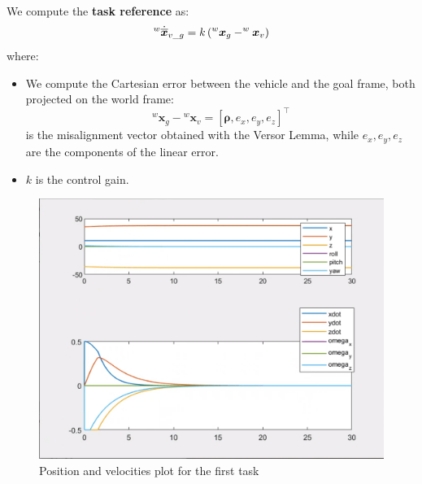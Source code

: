\documentclass{article}
\begin{document}
\noindent
\vspace{5px}
We compute the \textbf{task reference} as:
\begin{equation}
\large
    ^{w}\dot{\overline{\boldsymbol{x}}}_{v\_g}=k\left(^{w} \boldsymbol{x}_{g}-^{w} \boldsymbol{x}_{v}\right)
\end{equation}
where:
\begin{itemize}
\item We compute the Cartesian error between the vehicle and the goal frame, both projected on the world frame:
\begin{equation}
    {^w} \boldsymbol{x}_{g} - {^w}\boldsymbol{x}_{v} = [\boldsymbol{\rho}, e_{x}, e_{y}, e_{z}]^\top
\end{equation}
\boldsymbol{$\rho$} is the misalignment vector obtained with the Versor Lemma, while $e_{x}, e_{y}, e_{z}$ are the components of the linear error. 
\item $k$ is the control gain.
\end{itemize}

\begin{figure}[!h]
    \centering
    \includegraphics[scale=0.5]{111_ppdot.png}
    \caption{Position and velocities plot for the first task}
    \label{graph_1_1}
\end{figure}
\end{document}
